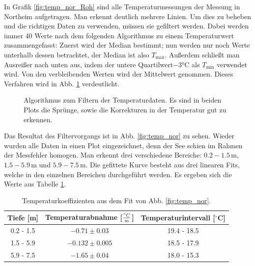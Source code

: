 \documentclass[12pt,a4paper,titlepage,headinclude,bibtotoc]{scrartcl}
\numberwithin{equation}{subsection}
\begin{document}
In Grafik \ref{fig:temp_nor_Roh} sind alle Temperaturmessungen der Messung in Northeim aufgetragen.
Man erkennt deutlich mehrere Linien.
Um dies zu beheben und die richtigen Daten zu verwenden, müssen sie gefiltert werden.
Dabei werden immer 40 Werte nach dem folgenden Algorithmus zu einem Temperaturwert zusammengefasst: 
Zuerst wird der Median bestimmt; nun werden nur noch Werte unterhalb dessen betrachtet, der Median ist also $T_\text{max}$. 
Außerdem schließt man Ausreißer nach unten aus, indem der untere Quartilwert$-3\si{\celsius}$ als $T_\text{min}$ verwendet wird.
Von den verbleibenden Werten wird der Mittelwert genommen.
Dieses Verfahren wird in Abb. \ref{fig:tempAlg} verdeutlicht.

\begin{figure}[!h]
	\centering
   \hfill
	\caption{Algorithmus zum Filtern der Temperaturdaten. Es sind in beiden Plots die Sprünge, sowie die Korrekturen in der Temperatur gut zu erkennen.}
	\label{fig:tempAlg}
\end{figure}

Das Resultat des Filtervorgangs ist in Abb. \ref{fig:temp_nor} zu sehen.
Wieder wurden alle Daten in einen Plot eingezeichnet, denn der See schien  im Rahmen der Messfehler homogen.
Man erkennt drei verschiedene Bereiche: $0.2-1.5\,$m, $1.5-5.9\,$m und $5.9-7.5\,$m.
Die gefittete Kurve besteht aus drei linearen Fits, welche in den einzelnen Bereichen durchgeführt werden.
Es ergeben sich die Werte aus Tabelle \ref{tab:tempTabNor}.

\begin{table}[!htb]
\centering
\begin{tabular}{|c||c|c|}
\hline
Tiefe [m] & Temperaturabnahme [$\frac{^\circ C}{\text m}$] & Temperaturintervall [$^\circ$C]\\\hline\hline
0.2 - 1.5 & $-0.71\pm  0.03$	& 19.4 - 18.5 \\
1.5 - 5.9 & $-0.132\pm 0.005$	& 18.5 - 17.9 \\
5.9 - 7.5 & $-1.65\pm 0.04$	& 18.0 - 15.3 \\\hline
\end{tabular}
\caption{Temperaturkoeffizienten aus dem Fit von Abb. \ref{fig:temp_nor}.}
\label{tab:tempTabNor}
\end{table}
\end{document}

